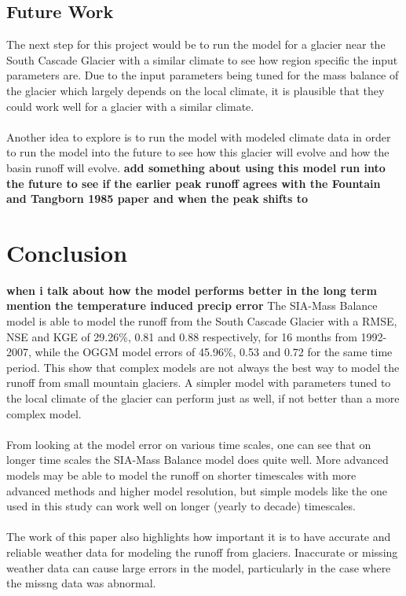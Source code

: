 \documentclass{article}
\begin{document}
\subsection{Future Work}
The next step for this project would be to run the model for a glacier near the South Cascade Glacier with a similar climate to see how region specific the input 
parameters are. Due to the input parameters being tuned for the mass balance of the glacier which largely depends on the local climate, it 
is plausible that they could work well for a glacier with a similar climate.
\paragraph{}
Another idea to explore is to run the model with modeled climate data in order to run the model into the future to see how this glacier 
will evolve and how the basin runoff will evolve.
\textbf{add something about using this model run into the future to see if the earlier peak runoff agrees with  the Fountain and Tangborn 1985 paper and when the peak shifts to}
\section{Conclusion}
\textbf{when i talk about how the model performs better in the long term mention the temperature induced precip error}
The SIA-Mass Balance model is able to model the runoff from the South Cascade Glacier with a RMSE, NSE and KGE of 29.26\%, 0.81 and 0.88 respectively, 
for 16 months from 1992-2007, while the OGGM model errors of 45.96\%, 0.53 and 0.72 for the same time period. This show that complex models are not always 
the best way to model the runoff from small mountain glaciers. A simpler model with parameters tuned to the local climate of the glacier can 
perform just as well, if not better than a more complex model. 
\paragraph{}
From looking at the model error on various time scales, one can see that on longer time scales the SIA-Mass Balance model does quite well. More 
advanced models may be able to model the runoff on shorter timescales with more advanced methods and higher model resolution, but simple models 
like the one used in this study can work well on longer (yearly to decade) timescales.
\paragraph{}
The work of this paper also highlights how important it is to have accurate and reliable weather data for modeling the runoff from glaciers. Inaccurate or 
missing weather data can cause large errors in the model, particularly in the case where the missng data was abnormal.
\end{document}
